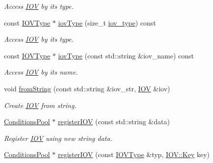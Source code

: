 \begin{DoxyCompactItemize}
\begin{DoxyCompactList}\small\item\em Access \hyperlink{class_d_d4hep_1_1_i_o_v}{IOV} by its type. \item\end{DoxyCompactList}\item 
const \hyperlink{class_d_d4hep_1_1_i_o_v_type}{IOVType} $\ast$ \hyperlink{class_d_d4hep_1_1_conditions_1_1_conditions_manager_object_a58a9d92f553861ae2d5fcf036a9b3d77}{iovType} (size\_\-t \hyperlink{class_d_d4hep_1_1_i_o_v}{iov\_\-type}) const 
\begin{DoxyCompactList}\small\item\em Access \hyperlink{class_d_d4hep_1_1_i_o_v}{IOV} by its type. \item\end{DoxyCompactList}\item 
const \hyperlink{class_d_d4hep_1_1_i_o_v_type}{IOVType} $\ast$ \hyperlink{class_d_d4hep_1_1_conditions_1_1_conditions_manager_object_a3b5688694720507165694439db5294b8}{iovType} (const std::string \&iov\_\-name) const 
\begin{DoxyCompactList}\small\item\em Access \hyperlink{class_d_d4hep_1_1_i_o_v}{IOV} by its name. \item\end{DoxyCompactList}\item 
void \hyperlink{class_d_d4hep_1_1_conditions_1_1_conditions_manager_object_a9ff0d68cbe3771a7a9354bdf518ddd11}{fromString} (const std::string \&iov\_\-str, \hyperlink{class_d_d4hep_1_1_i_o_v}{IOV} \&iov)
\begin{DoxyCompactList}\small\item\em Create \hyperlink{class_d_d4hep_1_1_i_o_v}{IOV} from string. \item\end{DoxyCompactList}\item 
\hyperlink{class_d_d4hep_1_1_conditions_1_1_conditions_pool}{ConditionsPool} $\ast$ \hyperlink{class_d_d4hep_1_1_conditions_1_1_conditions_manager_object_aead446d145420ab3f6e48c74194dff05}{registerIOV} (const std::string \&data)
\begin{DoxyCompactList}\small\item\em Register \hyperlink{class_d_d4hep_1_1_i_o_v}{IOV} using new string data. \item\end{DoxyCompactList}\item 
\hyperlink{class_d_d4hep_1_1_conditions_1_1_conditions_pool}{ConditionsPool} $\ast$ \hyperlink{class_d_d4hep_1_1_conditions_1_1_conditions_manager_object_ac6647d16096a5fccda601eada638e13b}{registerIOV} (const \hyperlink{class_d_d4hep_1_1_i_o_v_type}{IOVType} \&typ, \hyperlink{class_d_d4hep_1_1_i_o_v_a07cb46dc875296dc9cccf4ff370104ae}{IOV::Key} key)

\end{DoxyCompactItemize}
